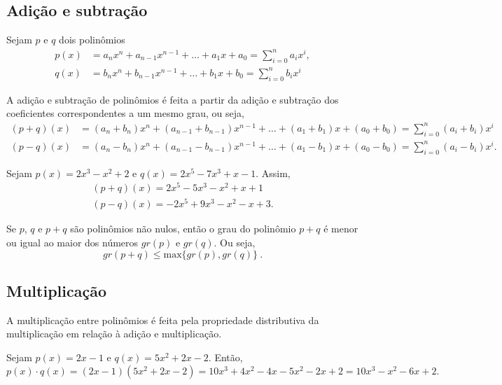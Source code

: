 \subsection{Adição e subtração}
 Sejam $p$ e $q$ dois polinômios
\begin{align*}
p(x)&= a_nx^n + a_{n-1}x^{n-1}+ \ldots + a_1x+ a_0= \sum_{i=0}^{n} a_ix^i,\\
q(x)&= b_nx^n + b_{n-1}x^{n-1}+ \ldots + b_1x+ b_0= \sum_{i=0}^{n} b_ix^i
\end{align*}

A adição e subtração de polinômios é feita a partir da adição e subtração dos coeficientes correspondentes a um mesmo grau, ou seja,
\begin{align*}
(p+q)(x)&= (a_n+ b_n)x^n + (a_{n-1}+b_{n-1})x^{n-1}+ \ldots + (a_1+b_1)x+ (a_0+b_0)= \sum_{i=0}^{n} (a_i+b_i)x^i\\
(p-q)(x)&= (a_n- b_n)x^n + (a_{n-1}-b_{n-1})x^{n-1}+ \ldots + (a_1-b_1)x+ (a_0-b_0)= \sum_{i=0}^{n} (a_i-b_i)x^i.
\end{align*}

\begin{exem}
    Sejam $p(x)=2x^3-x^2+2$ e $q(x)=2x^5-7x^3+x-1$. Assim,
    \begin{align*}
        (p+q)(x)=2x^5-5x^3-x^2+x+1\\
        (p-q)(x)=-2x^5+9x^3-x^2-x+3.
    \end{align*}
\end{exem}

  \begin{prop}
  Se $p$, $q$ e $p+q$ são polinômios não nulos, então o grau do polinômio $p+q$ é menor ou igual ao maior dos números $gr(p)$ e $gr(q)$. Ou seja,
\begin{equation*}
gr(p+q) \leq \text{max}\{gr(p), gr(q)\} \ .
\end{equation*}
  \end{prop}

\subsection{Multiplicação}
A multiplicação entre polinômios é feita pela propriedade distributiva da multiplicação em relação à adição e multiplicação.

\begin{exem}
    Sejam $p(x)=2x-1$ e $q(x)=5x^2+2x-2$. Então,
    \begin{equation*}
        p(x)\cdot q(x)= (2x-1)(5x^2+2x-2) = 10x^3+4x^2-4x-5x^2-2x+2=10x^3-x^2-6x+2.
    \end{equation*}
\end{exem}

